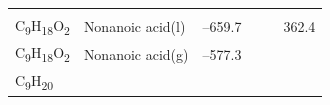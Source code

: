 \documentclass[
]{book}
\theoremstyle{definition}
\theoremstyle{definition}
\theoremstyle{definition}
\theoremstyle{remark}
\begin{document}
\begin{longtable}[]{@{}llllll@{}}
\begin{minipage}[t]{0.15\columnwidth}
\strut
\end{minipage} & \begin{minipage}[t]{0.14\columnwidth}\raggedright
\strut
\end{minipage} & \begin{minipage}[t]{0.14\columnwidth}\raggedright
\strut
\end{minipage}\tabularnewline
\begin{minipage}[t]{0.07\columnwidth}\raggedright
C\textsubscript{9}H\textsubscript{18}O\textsubscript{2}\strut
\end{minipage} & \begin{minipage}[t]{0.17\columnwidth}\raggedright
Nonanoic acid(l)\strut
\end{minipage} & \begin{minipage}[t]{0.15\columnwidth}\raggedright
--659.7\strut
\end{minipage} & \begin{minipage}[t]{0.15\columnwidth}\raggedright
\strut
\end{minipage} & \begin{minipage}[t]{0.14\columnwidth}\raggedright
\strut
\end{minipage} & \begin{minipage}[t]{0.14\columnwidth}\raggedright
362.4\strut
\end{minipage}\tabularnewline
\begin{minipage}[t]{0.07\columnwidth}\raggedright
C\textsubscript{9}H\textsubscript{18}O\textsubscript{2}\strut
\end{minipage} & \begin{minipage}[t]{0.17\columnwidth}\raggedright
Nonanoic acid(g)\strut
\end{minipage} & \begin{minipage}[t]{0.15\columnwidth}\raggedright
--577.3\strut
\end{minipage} & \begin{minipage}[t]{0.15\columnwidth}\raggedright
\strut
\end{minipage} & \begin{minipage}[t]{0.14\columnwidth}\raggedright
\strut
\end{minipage} & \begin{minipage}[t]{0.14\columnwidth}\raggedright
\strut
\end{minipage}\tabularnewline
\begin{minipage}[t]{0.07\columnwidth}\raggedright
C\textsubscript{9}H\textsubscript{20}\strut
\end{minipage} & \begin{minipage}[t]{0.17\columnwidth}\raggedright

\end{minipage}
\end{longtable}
\end{document}
